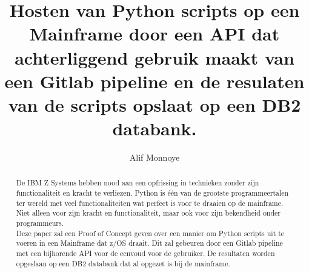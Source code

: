 \documentclass{hogent-article}
\title{Hosten van Python scripts op een Mainframe door een API dat achterliggend gebruik maakt van een Gitlab pipeline en de resulaten van de scripts opslaat op een DB2 databank.}
\author{Alif Monnoye}
\begin{document}
\begin{abstract}
  De IBM Z Systems hebben nood aan een opfrissing in technieken zonder zijn functionaliteit en kracht te verliezen. Python is één van de grootste programmeertalen ter wereld met veel functionaliteiten wat perfect is voor te draaien op de mainframe. Niet alleen voor zijn kracht en functionaliteit, maar ook voor zijn bekendheid onder programmeurs. \\
  Deze paper zal een Proof of Concept geven over een manier om Python scripts uit te voeren in een Mainframe dat z/OS draait. Dit zal gebeuren door een Gitlab pipeline met een bijhorende API voor de eenvoud voor de gebruiker. De resultaten worden opgeslaan op een DB2 databank dat al opgezet is bij de mainframe.
\end{abstract}

\tableofcontents



\printbibliography[heading=bibintoc]
\end{document}
